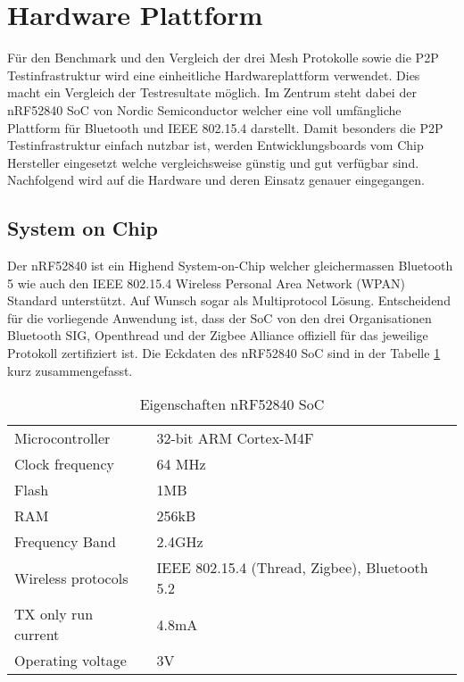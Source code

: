 \clearpage
\section{Hardware Plattform}\label{sec:HardwarePlattform}

Für den Benchmark und den Vergleich der drei Mesh Protokolle sowie die P2P Testinfrastruktur wird eine einheitliche Hardwareplattform verwendet. Dies macht ein Vergleich der Testresultate möglich. Im Zentrum steht dabei der nRF52840 SoC von Nordic Semiconductor welcher eine voll umfängliche Plattform für Bluetooth und IEEE 802.15.4 darstellt. Damit besonders die P2P Testinfrastruktur einfach nutzbar ist, werden Entwicklungsboards vom Chip Hersteller eingesetzt welche vergleichsweise günstig und gut verfügbar sind. Nachfolgend wird auf die Hardware und deren Einsatz genauer eingegangen.


\subsection{System on Chip}\label{subsec:SystemonChip}

Der nRF52840 ist ein Highend System-on-Chip welcher gleichermassen Bluetooth 5 wie auch den IEEE 802.15.4 Wireless Personal Area Network (WPAN) Standard unterstützt. Auf Wunsch sogar als Multiprotocol Lösung.
Entscheidend für die vorliegende Anwendung ist, dass der SoC von den drei Organisationen Bluetooth SIG, Openthread und der Zigbee Alliance offiziell für das jeweilige Protokoll zertifiziert ist.
Die Eckdaten des nRF52840 SoC sind in der Tabelle \ref{tab:EigenschaftennRF52840SoC} kurz zusammengefasst.

\begin{table}[h]
\centering
\begin{tabular}{ll}
\toprule
Microcontroller    & 32-bit ARM Cortex-M4F                        \\
Clock frequency    & 64 MHz                                       \\
Flash              & 1MB                                        \\
RAM                & 256kB \\
Frequency Band     & 2.4GHz   \\
Wireless protocols & IEEE 802.15.4 (Thread, Zigbee), Bluetooth 5.2  \\
TX only run current & 4.8mA \\
Operating voltage  & 3V \\
\bottomrule
\end{tabular}
\caption{Eigenschaften nRF52840 SoC \cite{nordic_semiconductor_asa_nrf52840_2020}\cite{nordic_semiconductor_asa_nrf52840_ps_v11pdf_nodate}}
\label{tab:EigenschaftennRF52840SoC}
\end{table}

